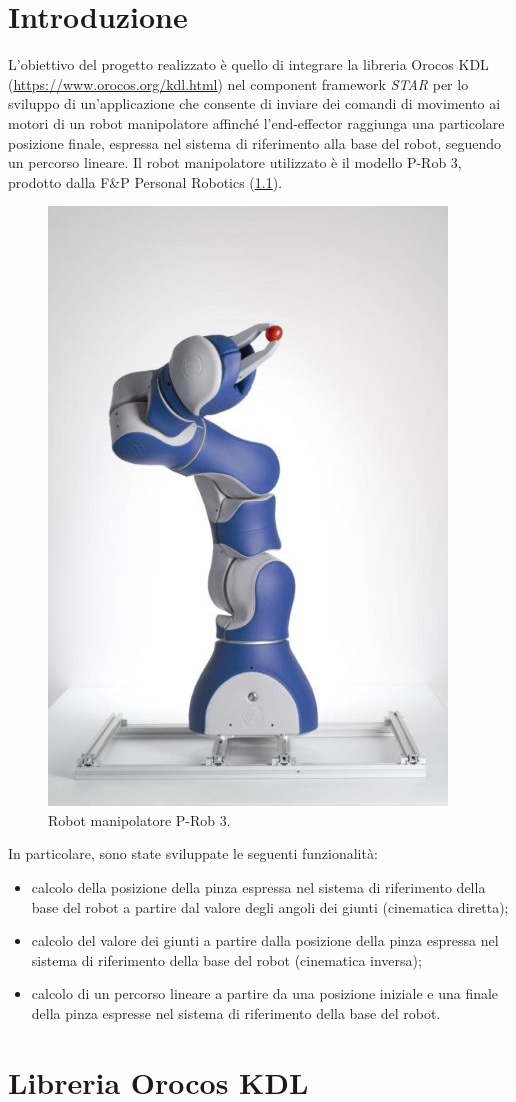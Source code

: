 
\chapter{Introduzione}
L'obiettivo del progetto realizzato è quello di integrare la libreria Orocos KDL (\url{https://www.orocos.org/kdl.html}) nel component framework \textit{STAR} per lo sviluppo di un'applicazione che consente di inviare dei comandi di movimento ai motori di un robot manipolatore affinché l'end-effector raggiunga una particolare posizione finale, espressa nel sistema di riferimento alla base del robot, seguendo un percorso lineare. Il robot manipolatore utilizzato è il modello P-Rob 3, prodotto dalla F\&P Personal Robotics (\Fig\ref{fig:prob3}). 
\begin{figure}[b!]
	\centering
	\includegraphics[width=0.4\linewidth]{./ImageFiles/P-Rob 3.jpg}
	\caption{Robot manipolatore P-Rob 3.}
	\label{fig:prob3}
\end{figure}
In particolare, sono state sviluppate le seguenti funzionalità:
\begin{itemize}
	\item calcolo della posizione della pinza espressa nel sistema di riferimento della base del robot a partire dal valore degli angoli dei giunti (cinematica diretta);
	\item calcolo del valore dei giunti a partire dalla posizione della pinza espressa nel sistema di riferimento della base del robot (cinematica inversa);
	\item calcolo di un percorso lineare a partire da una posizione iniziale e una finale della pinza espresse nel sistema di riferimento della base del robot.
\end{itemize}

\chapter{Libreria Orocos KDL}
